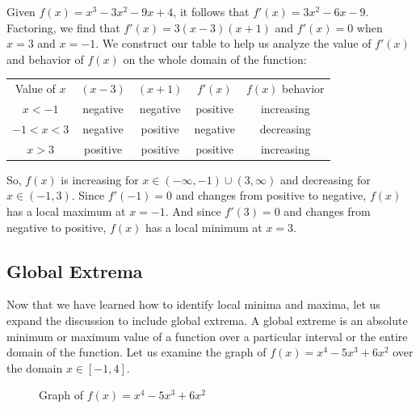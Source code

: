 \begin{Answer}[ref=locext1]
Given $f(x)=x^3-3x^2-9x+4$, it follows that $f'(x)=3x^2-6x-9$. Factoring, we 
find that $f'(x) = 3(x-3)(x+1)$ and $f'(x) = 0$ when $x=3$ and $x=-1$. We 
construct our table to help us analyze the value of $f'(x)$ and behavior of 
$f(x)$ on the whole domain of the function:
\begin{center}
	\begin{tabular}{c|c|c|c|c}
		Value of $x$ & $(x-3)$ & $(x+1)$ & $f'(x)$ & $f(x)$ behavior\\
		$x<-1$ & negative & negative & positive & increasing\\
		$-1<x<3$ & negative & positive & negative & decreasing\\
		$x>3$ & positive & positive & positive & increasing
	\end{tabular}
\end{center}
So, $f(x)$ is increasing for $x \in (-\infty, -1) \cup (3, \infty)$ and 
decreasing for $x \in (-1, 3)$. Since $f'(-1)=0$ and changes from positive to 
negative, $f(x)$ has a local maximum at $x=-1$. And since $f'(3)=0$ and 
changes from negative to positive, $f(x)$ has a local minimum at $x=3$.
\end{Answer}



\subsection{Global Extrema}
Now that we have learned how to identify local minima and maxima, let us expand 
the discussion to include global extrema. A global extreme is an absolute 
minimum or maximum value of a function over a particular interval or the entire 
domain of the function. Let us examine the graph of $f(x) = x^4-5x^3+6x^2$ over 
the domain $x \in [-1,4]$.


\begin{figure}[H]
  \centering
  \caption{Graph of \( f(x) = x^4-5x^3+6x^2 \) }
  \label{fig:globalext}
\end{figure}

